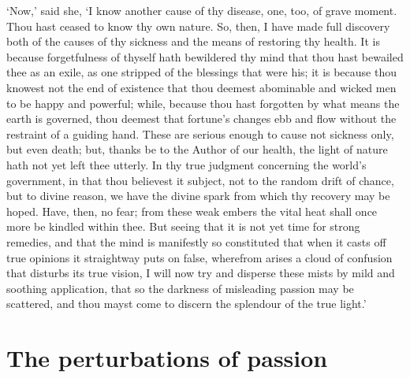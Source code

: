 \documentclass[12pt]{book}
\begin{document}
`Now,' said she, `I know another cause of thy disease, one, too, of
grave moment. Thou hast ceased to know thy own nature. So, then, I have
made full discovery both of the causes of thy sickness and the means of
restoring thy health. It is because forgetfulness of thyself hath
bewildered thy mind that thou hast bewailed thee as an exile, as one
stripped of the blessings that were his; it is because thou knowest not
the end of existence that thou deemest abominable and wicked men to be
happy and powerful; while, because thou hast forgotten by what means the
earth is governed, thou deemest that fortune's changes ebb and flow
without the restraint of a guiding hand. These are serious enough to
cause not sickness only, but even death; but, thanks be to the Author of
our health, the light of nature hath not yet left thee utterly. In thy
true judgment concerning the world's government, in that thou believest
it subject, not to the random drift of chance, but to divine reason, we
have the divine spark from which thy recovery may be hoped. Have, then,
no fear; from these weak embers the vital heat shall once more be
kindled within thee. But seeing that it is not yet time for strong
remedies, and that the mind is manifestly so constituted that when it
casts off true opinions it straightway puts on false, wherefrom arises a
cloud of confusion that disturbs its true vision, I will now try and
disperse these mists by mild and soothing application, that so the
darkness of misleading passion may be scattered, and thou mayst come to
discern the splendour of the true light.'


\section{The perturbations of passion}
\end{document}
